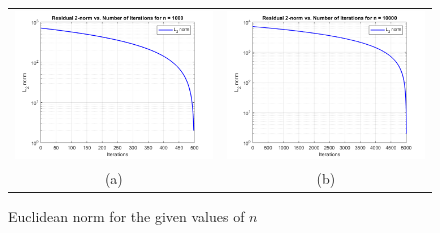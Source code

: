 \documentclass[a4paper,11pt]{article}
\begin{document}
\begin{figure}[!ht]
	\centering
	\begin{tabular}{cc}
		\includegraphics[width=.55\textwidth]{CG1_1e3_norm} &\hspace{-25pt} \includegraphics[width=.55\textwidth]{CG1_1e4_norm} \\
		(a) & (b)\\
	\end{tabular}
	\caption{Euclidean norm for the given values of $n$}
	\label{}
\end{figure}
\end{document}
